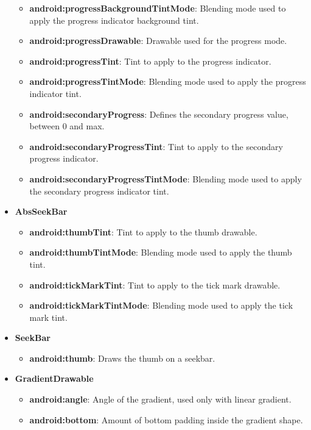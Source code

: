 \documentclass{report}
\begin{document}
\begin{itemize}
\begin{itemize}
                \item \textbf{android:progressBackgroundTintMode}:	Blending mode used to apply the progress indicator background tint. 
                \item \textbf{android:progressDrawable}:	Drawable used for the progress mode. 
                \item \textbf{android:progressTint}:	Tint to apply to the progress indicator. 
                \item \textbf{android:progressTintMode}:	Blending mode used to apply the progress indicator tint. 
                \item \textbf{android:secondaryProgress}:	Defines the secondary progress value, between 0 and max. 
                \item \textbf{android:secondaryProgressTint}:	Tint to apply to the secondary progress indicator. 
                \item \textbf{android:secondaryProgressTintMode}:	Blending mode used to apply the secondary progress indicator tint. 
            \end{itemize}
        \item \textbf{AbsSeekBar}
            \begin{itemize}
                \item \textbf{android:thumbTint}:	Tint to apply to the thumb drawable. 
                \item \textbf{android:thumbTintMode}:	Blending mode used to apply the thumb tint. 
                \item \textbf{android:tickMarkTint}:	Tint to apply to the tick mark drawable. 
                \item \textbf{android:tickMarkTintMode}:	Blending mode used to apply the tick mark tint. 
            \end{itemize}
        \item \textbf{SeekBar}
            \begin{itemize}
                \item \textbf{android:thumb}: Draws the thumb on a seekbar. 
            \end{itemize}
        \item \textbf{GradientDrawable}
            \begin{itemize}
                \item \textbf{android:angle}:	Angle of the gradient, used only with linear gradient. 
                \item \textbf{android:bottom}:	Amount of bottom padding inside the gradient shape. 

\end{itemize}
\end{itemize}
\end{document}
